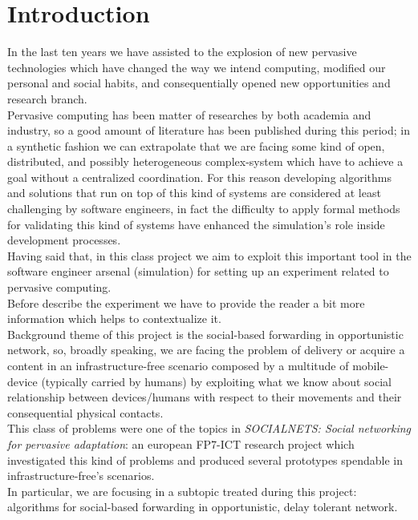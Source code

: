 \section{Introduction}
\label{intro}

In the last ten years we have assisted to the explosion of new pervasive technologies which have changed the way we intend computing, modified our personal and social habits, and consequentially opened new opportunities and research branch.\\
Pervasive computing has been matter of researches by both academia and industry, so a good amount of literature has been published during this period; in a synthetic fashion we can extrapolate that we are facing some kind of open, distributed, and possibly heterogeneous complex-system which have to achieve a goal without a centralized coordination. For this reason developing algorithms and solutions that run on top of this kind of systems are considered at least challenging by software engineers, in fact the difficulty to apply formal methods for validating this kind of systems have enhanced the simulation's role inside development processes. \\
Having said that, in this class project we aim to exploit this important tool in the software engineer arsenal (simulation) for setting up an experiment related to pervasive computing.\\
Before describe the experiment we have to provide the reader a bit more information which helps to contextualize it. \\
Background theme of this project is the social-based forwarding in opportunistic network, so, broadly speaking, we are facing the problem of delivery or acquire a content in an infrastructure-free scenario composed by a multitude of mobile-device (typically carried by humans) by exploiting what we know about social relationship between devices/humans with respect to their movements and their consequential physical contacts. \\
This class of problems were one of the topics in \emph{SOCIALNETS: Social networking for pervasive adaptation}\cite{socialnetseu}: an european FP7-ICT research project which investigated this kind of problems and produced several prototypes spendable in infrastructure-free's scenarios. \\
In particular, we are focusing in a subtopic treated during this project: algorithms for social-based forwarding in opportunistic, delay tolerant network. \\
